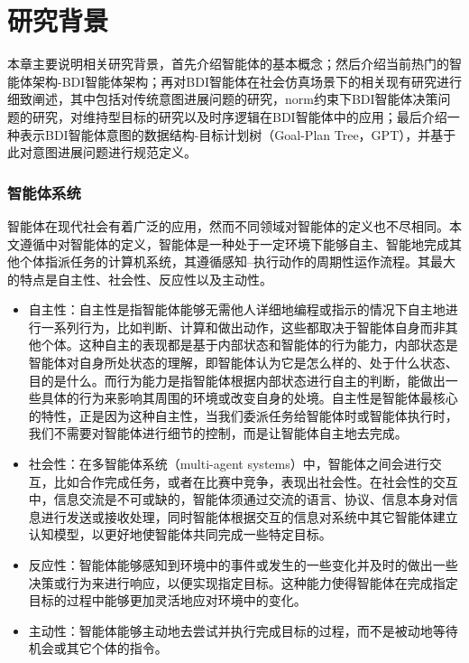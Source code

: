 \chapter{研究背景}\label{background}
本章主要说明相关研究背景，首先介绍智能体的基本概念；然后介绍当前热门的智能体架构-BDI智能体架构；再对BDI智能体在社会仿真场景下的相关现有研究进行细致阐述，其中包括对传统意图进展问题的研究，norm约束下BDI智能体决策问题的研究，对维持型目标的研究以及时序逻辑在BDI智能体中的应用；最后介绍一种表示BDI智能体意图的数据结构-目标计划树（Goal-Plan Tree，GPT），并基于此对意图进展问题进行规范定义。
\subsection{智能体系统}
智能体在现代社会有着广泛的应用，然而不同领域对智能体的定义也不尽相同。本文遵循\cite{DBLP:journals/ker/WooldridgeJ95}中对智能体的定义，智能体是一种处于一定环境下能够自主、智能地完成其他个体指派任务的计算机系统，其遵循感知--执行动作的周期性运作流程。其最大的特点是自主性、社会性、反应性以及主动性。
\begin{itemize}
  \item 自主性：自主性是指智能体能够无需他人详细地编程或指示的情况下自主地进行一系列行为，比如判断、计算和做出动作，这些都取决于智能体自身而非其他个体。这种自主的表现都是基于内部状态和智能体的行为能力，内部状态是智能体对自身所处状态的理解，即智能体认为它是怎么样的、处于什么状态、目的是什么。而行为能力是指智能体根据内部状态进行自主的判断，能做出一些具体的行为来影响其周围的环境或改变自身的处境。自主性是智能体最核心的特性，正是因为这种自主性，当我们委派任务给智能体时或智能体执行时，我们不需要对智能体进行细节的控制，而是让智能体自主地去完成。
  \item 社会性：在多智能体系统（multi-agent systems）中，智能体之间会进行交互，比如合作完成任务，或者在比赛中竞争，表现出社会性。在社会性的交互中，信息交流是不可或缺的，智能体须通过交流的语言、协议、信息本身对信息进行发送或接收处理，同时智能体根据交互的信息对系统中其它智能体建立认知模型，以更好地使智能体共同完成一些特定目标。
   \item 反应性：智能体能够感知到环境中的事件或发生的一些变化并及时的做出一些决策或行为来进行响应，以便实现指定目标。这种能力使得智能体在完成指定目标的过程中能够更加灵活地应对环境中的变化。
   \item 主动性：智能体能够主动地去尝试并执行完成目标的过程，而不是被动地等待机会或其它个体的指令。
\end{itemize}
